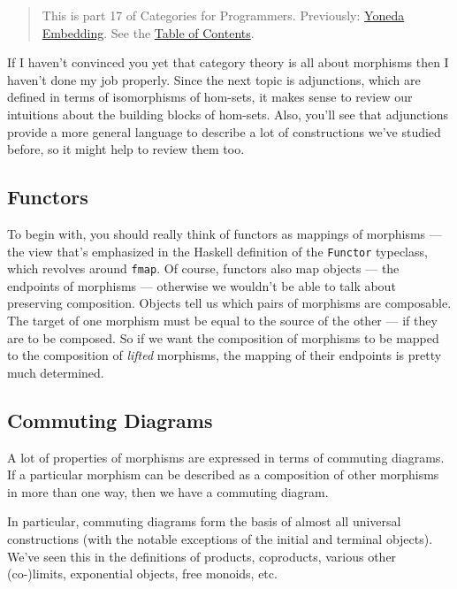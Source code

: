 \begin{quote}
This is part 17 of Categories for Programmers. Previously:
\href{https://bartoszmilewski.com/2015/10/28/yoneda-embedding/}{Yoneda
Embedding}. See the
\href{https://bartoszmilewski.com/2014/10/28/category-theory-for-programmers-the-preface/}{Table
of Contents}.
\end{quote}

If I haven't convinced you yet that category theory is all about
morphisms then I haven't done my job properly. Since the next topic is
adjunctions, which are defined in terms of isomorphisms of hom-sets, it
makes sense to review our intuitions about the building blocks of
hom-sets. Also, you'll see that adjunctions provide a more general
language to describe a lot of constructions we've studied before, so it
might help to review them too.

\subsection{Functors}\label{functors}

To begin with, you should really think of functors as mappings of
morphisms --- the view that's emphasized in the Haskell definition of
the \texttt{Functor} typeclass, which revolves around \texttt{fmap}. Of
course, functors also map objects --- the endpoints of morphisms ---
otherwise we wouldn't be able to talk about preserving composition.
Objects tell us which pairs of morphisms are composable. The target of
one morphism must be equal to the source of the other --- if they are to
be composed. So if we want the composition of morphisms to be mapped to
the composition of \emph{lifted} morphisms, the mapping of their
endpoints is pretty much determined.

\subsection{Commuting Diagrams}\label{commuting-diagrams}

A lot of properties of morphisms are expressed in terms of commuting
diagrams. If a particular morphism can be described as a composition of
other morphisms in more than one way, then we have a commuting diagram.

In particular, commuting diagrams form the basis of almost all universal
constructions (with the notable exceptions of the initial and terminal
objects). We've seen this in the definitions of products, coproducts,
various other (co-)limits, exponential objects, free monoids, etc.

